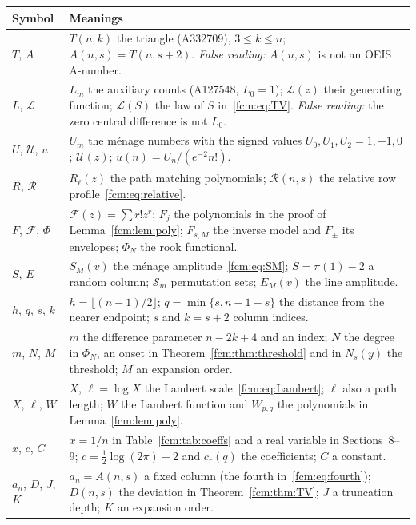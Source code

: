 \documentclass[11pt,letterpaper]{article}
\theoremstyle{remark}\newtheorem{remark}[theorem]{Remark}
\newcommand{\RR}{\mathcal R}
\begin{document}
\noindent\begin{tabular}{@{}>{\raggedright\arraybackslash}p{0.8in}>{\raggedright\arraybackslash}p{5.4in}@{}}
\toprule
Symbol & Meanings\\
\midrule
$T$, $A$ & $T(n,k)$ the triangle (A332709), $3\le k\le n$; $A(n,s)=T(n,s+2)$. \emph{False reading:} $A(n,s)$ is not an OEIS A-number.\\
$L$, $\mathcal L$ & $L_m$ the auxiliary counts (A127548, $L_0=1$); $\mathcal L(z)$ their generating function; $\mathcal L(S)$ the law of $S$ in~\eqref{fcm:eq:TV}. \emph{False reading:} the zero central difference is not $L_0$.\\
$U$, $\mathcal U$, $u$ & $U_m$ the m\'enage numbers with the signed values $U_0,U_1,U_2=1,-1,0$; $\mathcal U(z)$; $u(n)=U_n/(e^{-2}n!)$.\\
$R$, $\RR$ & $R_\ell(z)$ the path matching polynomials; $\RR(n,s)$ the relative row profile~\eqref{fcm:eq:relative}.\\
$F$, $\mathcal F$, $\Phi$ & $\mathcal F(z)=\sum r!z^r$; $F_j$ the polynomials in the proof of Lemma~\ref{fcm:lem:poly}; $F_{s,M}$ the inverse model and $F_\pm$ its envelopes; $\Phi_N$ the rook functional.\\
$S$, $E$ & $S_M(v)$ the ménage amplitude~\eqref{fcm:eq:SM}; $S=\pi(1)-2$ a random column; $\mathcal S_m$ permutation sets; $E_M(v)$ the line amplitude.\\
$h$, $q$, $s$, $k$ & $h=\lfloor(n-1)/2\rfloor$; $q=\min\{s,n-1-s\}$ the distance from the nearer endpoint; $s$ and $k=s+2$ column indices.\\
$m$, $N$, $M$ & $m$ the difference parameter $n-2k+4$ and an index; $N$ the degree in $\Phi_N$, an onset in Theorem~\ref{fcm:thm:threshold} and in $N_s(y)$ the threshold; $M$ an expansion order.\\
$X$, $\ell$, $W$ & $X$, $\ell=\log X$ the Lambert scale~\eqref{fcm:eq:Lambert}; $\ell$ also a path length; $W$ the Lambert function and $W_{p,q}$ the polynomials in Lemma~\ref{fcm:lem:poly}.\\
$x$, $c$, $C$ & $x=1/n$ in Table~\ref{fcm:tab:coeffs} and a real variable in Sections~8--9; $c=\frac12\log(2\pi)-2$ and $c_r(q)$ the coefficients; $C$ a constant.\\
$a_n$, $D$, $J$, $K$ & $a_n=A(n,s)$ a fixed column (the fourth in~\eqref{fcm:eq:fourth}); $D(n,s)$ the deviation in Theorem~\ref{fcm:thm:TV}; $J$ a truncation depth; $K$ an expansion order.\\
\bottomrule
\end{tabular}
\endgroup
\end{document}
